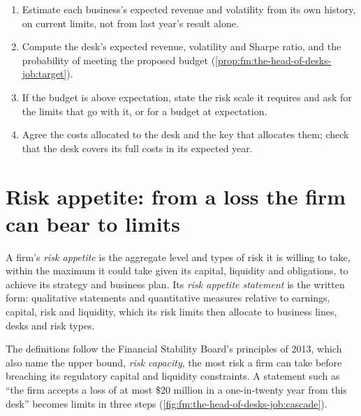 \begin{method}\label{met:fm:the-head-of-desks-job:budget}
\begin{enumerate}
\item Estimate each business's expected revenue and volatility from its own history, on current limits, not from last year's result alone.
\item Compute the desk's expected revenue, volatility and Sharpe ratio, and the probability of meeting the proposed budget
(\cref{prop:fm:the-head-of-desks-job:target}).
\item If the budget is above expectation, state the risk scale it requires and ask for the limits that go with it, or for a budget at
expectation.
\item Agree the costs allocated to the desk and the key that allocates them; check that the desk covers its full costs in its expected year.
\end{enumerate}
\end{method}

\section{Risk appetite: from a loss the firm can bear to limits}

\begin{definition}\label{def:fm:the-head-of-desks-job:appetite}
A firm's \emph{risk appetite} is the aggregate level and types of risk it is willing to take, within the maximum it could
take given its capital, liquidity and obligations, to achieve its strategy and business plan. Its \emph{risk appetite
statement} is the written form: qualitative statements and quantitative measures relative to earnings,
capital, risk and liquidity, which its risk limits then allocate to business lines, desks and risk types.
\end{definition}

The definitions follow the Financial Stability Board's principles of 2013, which also name the upper bound, \emph{risk capacity}, the most
risk a firm can take before breaching its regulatory capital and liquidity constraints. A statement such as ``the firm accepts a loss of at most
\$20 million in a one-in-twenty year from this desk'' becomes limits in three steps (\cref{fig:fm:the-head-of-desks-job:cascade}).

